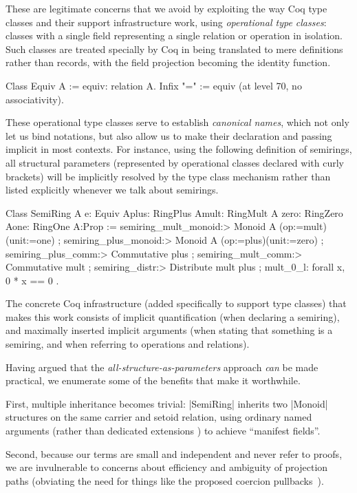 \documentclass{llncs}
\begin{document}
These are legitimate concerns that we avoid by exploiting the way Coq type classes and their support infrastructure work, using \emph{operational type classes}: classes with a single field representing a single relation or operation in isolation. Such classes are treated specially by Coq in being translated to mere definitions rather than records, with the field projection becoming the identity function.
\begin{code}
 Class Equiv A := equiv: relation A.
 Infix "=" := equiv (at level 70, no associativity).
\end{code}
These operational type classes serve to establish \emph{canonical names}, which not only let us bind notations, but also allow us to make their declaration and passing implicit in most contexts. For instance, using the following definition of semirings, all structural parameters (represented by operational classes declared with curly brackets) will be implicitly resolved by the type class mechanism rather than listed explicitly whenever we talk about semirings.
\begin{code}
Class SemiRing A {e: Equiv A}{plus: RingPlus A}{mult: RingMult A}
                 {zero: RingZero A}{one: RingOne A}:Prop :=
  { semiring_mult_monoid:> Monoid A (op:=mult)(unit:=one)
  ; semiring_plus_monoid:> Monoid A (op:=plus)(unit:=zero)
  ; semiring_plus_comm:> Commutative plus
  ; semiring_mult_comm:> Commutative mult
  ; semiring_distr:> Distribute mult plus
  ; mult_0_l: forall x, 0 * x == 0 }.
\end{code}
The concrete Coq infrastructure (added specifically to support type classes) that makes this work consists of implicit quantification (when declaring a semiring), and maximally inserted implicit arguments (when stating that something is a semiring, and when referring to operations and relations).

Having argued that the \emph{all-structure-as-parameters} approach \emph{can} be made practical, we enumerate some of the benefits that make it worthwhile.

First, multiple inheritance becomes trivial: |SemiRing| inherits two |Monoid| structures on the same carrier and setoid relation, using ordinary named arguments (rather than dedicated extensions \cite{DBLP:conf/types/Luo08}) to achieve ``manifest fields''.

Second, because our terms are small and independent and never refer to proofs, we are invulnerable to concerns about efficiency and ambiguity of projection paths (obviating the need for things like the proposed coercion pullbacks~\cite{Hints}).
\end{document}
